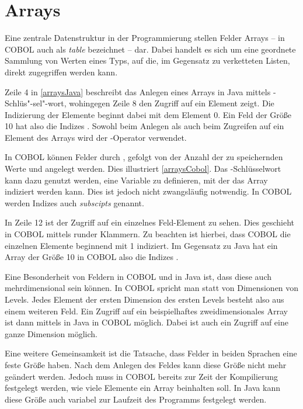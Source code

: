 \section{Arrays}\label{sec:felder}
Eine zentrale Datenstruktur in der Programmierung stellen Felder \bzw Arrays -- in COBOL auch als \textit{table} bezeichnet -- dar. Dabei handelt es sich um eine geordnete Sammlung von Werten eines Typs, auf die, im Gegensatz zu \zB verketteten Listen, direkt zugegriffen werden kann. 

Zeile 4 in \autoref{arraysJava} beschreibt das Anlegen eines Arrays in Java mittels -Schlüs"-sel"-wort, wohingegen Zeile 8 den Zugriff auf ein Element zeigt. Die Indizierung der Elemente beginnt dabei mit dem Element 0. Ein Feld der Größe 10 hat also die Indizes . Sowohl beim Anlegen als auch beim Zugreifen auf ein Element des Arrays wird der \jav{[]}-Operator verwendet.

In COBOL können Felder durch , gefolgt von der Anzahl der zu speichernden Werte und  angelegt werden. Dies illustriert \autoref{arraysCobol}. Das -Schlüsselwort kann dazu genutzt werden, eine Variable zu definieren, mit der das Array indiziert werden kann. Dies ist jedoch nicht zwangsläufig notwendig. In COBOL werden Indizes auch \textit{subscipts} genannt.

In Zeile 12 ist der Zugriff auf ein einzelnes Feld-Element zu sehen. Dies geschieht in COBOL mittels runder Klammern. Zu beachten ist hierbei, dass COBOL die einzelnen Elemente beginnend mit 1 indiziert. Im Gegensatz zu Java hat ein Array der Größe 10 in COBOL also die Indizes .

Eine Besonderheit von Feldern in COBOL und in Java ist, dass diese auch mehrdimensional sein können. In COBOL spricht man statt von Dimensionen von Levels. Jedes Element der ersten Dimension \bzw des ersten Levels besteht also aus einem weiteren Feld. Ein Zugriff auf ein beispielhaftes zweidimensionales Array ist dann mittels \jav{[][]} in Java \bzw {} in COBOL möglich. Dabei ist auch ein Zugriff auf eine ganze Dimension möglich.

Eine weitere Gemeinsamkeit ist die Tatsache, dass Felder in beiden Sprachen eine feste Größe haben. Nach dem Anlegen des Feldes kann diese Größe nicht mehr geändert werden. Jedoch muss in COBOL bereits zur Zeit der Kompilierung festgelegt werden, wie viele Elemente ein Array beinhalten soll. In Java kann diese Größe auch variabel zur Laufzeit des Programms festgelegt werden.
